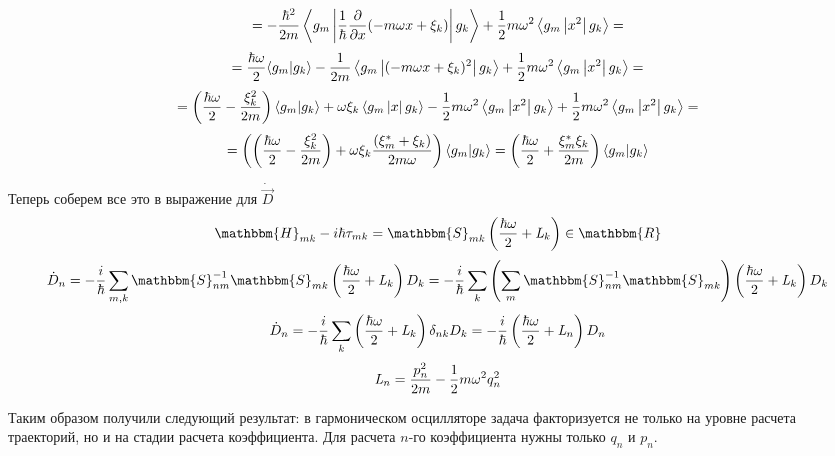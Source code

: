 \begin{enumerate}
$$=-\frac{\hbar^2}{2m}\left\langle g_m \left| \frac{1}{\hbar}\frac{\partial}{\partial x} (-m\omega x + \xi_k) \right| g_k \right\rangle + \frac{1}{2}m\omega^2\left\langle g_m \left| x^2 \right| g_k \right\rangle=$$
$$=\frac{\hbar\omega}{2}\langle g_m | g_k \rangle - \frac{1}{2m}\left\langle g_m \left| (-m\omega x + \xi_k)^2 \right| g_k \right\rangle + \frac{1}{2}m\omega^2\left\langle g_m \left| x^2 \right| g_k \right\rangle=$$
$$=\left(\frac{\hbar\omega}{2}-\frac{\xi_k^2}{2m}\right)\myint{g_m}{g_k}+\omega\xi_k\mymean{g_m}{x}{g_k}-%
	 \frac{1}{2}m\omega^2\mymean{g_m}{x^2}{g_k} + \frac{1}{2}m\omega^2\mymean{g_m}{x^2}{g_k}=$$
$$=\left(\left(\frac{\hbar\omega}{2}-\frac{\xi_k^2}{2m}\right)+\omega\xi_k\frac{(\xi_m^*+\xi_k)}{2m\omega}\right)\myint{g_m}{g_k}=%
   \left(\frac{\hbar\omega}{2}+\frac{\xi_m^*\xi_k}{2m}\right)\myint{g_m}{g_k}$$
\end{enumerate}

Теперь соберем все это в выражение для $\dot{\vec{D}}$
$$\mathbbm{H}_{mk}-i\hbar\tau_{mk}=\mathbbm{S}_{mk}\left(\frac{\hbar\omega}{2}+\myl_k\right)\in\mathbbm{R}$$
$$\dot{D}_n=-\frac{i}{\hbar}\sum_{m,k}\mathbbm{S}_{nm}^{-1}\mathbbm{S}_{mk}\left(\frac{\hbar\omega}{2}+\myl_k\right)D_k=%
	    -\frac{i}{\hbar}\sum_k\left(\sum_m\mathbbm{S}_{nm}^{-1}\mathbbm{S}_{mk}\right)%
				  \left(\frac{\hbar\omega}{2}+\myl_k\right)D_k$$
$$\dot{D}_n=-\frac{i}{\hbar}\sum_k\left(\frac{\hbar\omega}{2}+\myl_k\right)\delta_{nk}D_k=%
	    -\frac{i}{\hbar}\left(\frac{\hbar\omega}{2}+\myl_n\right)D_n$$
$$\mathit{L}_n=\frac{p_n^2}{2m} - \frac{1}{2}m\omega^2q_n^2$$

Таким образом получили следующий результат: в гармоническом осцилляторе задача факторизуется не только на уровне расчета траекторий,
но и на стадии расчета коэффициента. Для расчета $n$-го коэффициента нужны только $q_n$ и $p_n$.

